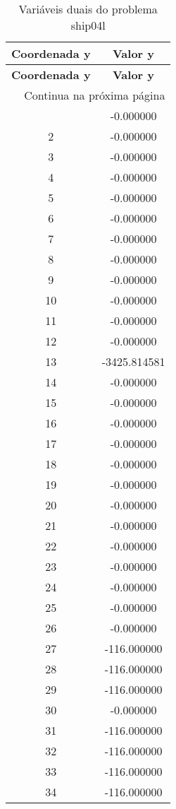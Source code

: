 \documentclass[12pt]{article}
\begin{document}
\begin{longtable}{@{}cc@{}}
\caption{Variáveis duais do problema ship04l} \\
\toprule
\textbf{Coordenada y} & \textbf{Valor y} \\
\midrule
\endfirsthead

\toprule
\textbf{Coordenada y} & \textbf{Valor y} \\
\midrule
\endhead

\midrule \multicolumn{2}{r}{{Continua na próxima página}} \\ \midrule
\endfoot

\bottomrule
\endlastfoot
1 & -0.000000 \\
2 & -0.000000 \\
3 & -0.000000 \\
4 & -0.000000 \\
5 & -0.000000 \\
6 & -0.000000 \\
7 & -0.000000 \\
8 & -0.000000 \\
9 & -0.000000 \\
10 & -0.000000 \\
11 & -0.000000 \\
12 & -0.000000 \\
13 & -3425.814581 \\
14 & -0.000000 \\
15 & -0.000000 \\
16 & -0.000000 \\
17 & -0.000000 \\
18 & -0.000000 \\
19 & -0.000000 \\
20 & -0.000000 \\
21 & -0.000000 \\
22 & -0.000000 \\
23 & -0.000000 \\
24 & -0.000000 \\
25 & -0.000000 \\
26 & -0.000000 \\
27 & -116.000000 \\
28 & -116.000000 \\
29 & -116.000000 \\
30 & -0.000000 \\
31 & -116.000000 \\
32 & -116.000000 \\
33 & -116.000000 \\
34 & -116.000000 \\

\end{longtable}
\end{document}
